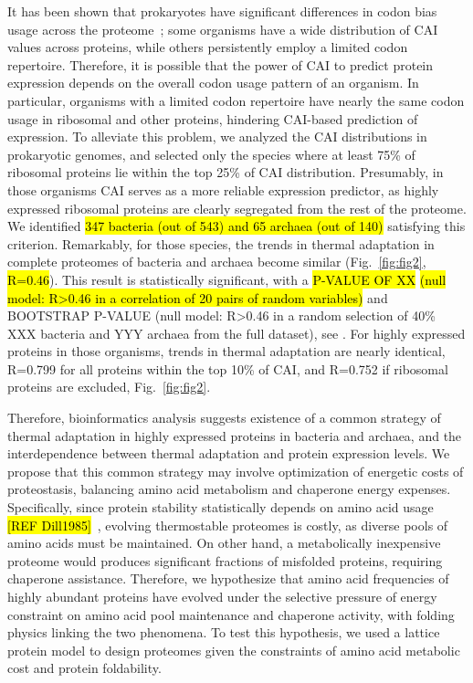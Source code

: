 \documentclass[10pt,letterpaper]{article}
\begin{document}
It has been shown that prokaryotes have significant differences in codon bias usage across the proteome~\cite{Botzman2011Variation}; some organisms have a wide distribution of CAI values across proteins, while others persistently employ a limited codon repertoire. Therefore, it is possible that the  power of CAI to predict protein expression depends on the overall codon usage pattern of an organism. In particular, organisms with a limited codon repertoire have nearly the same codon usage in ribosomal and other proteins, hindering CAI-based prediction of expression. To alleviate this problem, we analyzed the CAI distributions in prokaryotic genomes, and selected only the species where at least 75\% of ribosomal proteins lie within the top 25\% of CAI distribution. Presumably, in those organisms CAI serves as a more reliable expression predictor, as highly expressed ribosomal proteins are clearly segregated from the rest of the proteome. We identified \hl{347 bacteria (out of 543) and 65 archaea (out of 140)} satisfying this criterion. Remarkably, for those species, the trends in thermal adaptation in complete proteomes of bacteria and archaea become similar (Fig.~\ref{fig:fig2}, \hl{R=0.46}). This result is statistically significant, with a \hl{P-VALUE OF XX } \hl{(null model: R>0.46 in a correlation of 20 pairs of random variables)} and  BOOTSTRAP P-VALUE (null model: R>0.46 in a random selection of 40\% XXX bacteria and YYY archaea from the full dataset), see .  For highly expressed proteins in those organisms, trends in thermal adaptation are nearly identical, R=0.799 for all proteins within the top 10\% of CAI, and R=0.752 if ribosomal proteins are excluded, Fig.~\ref{fig:fig2}.

Therefore, bioinformatics analysis suggests existence of a common strategy of thermal adaptation in highly expressed proteins in bacteria and archaea, and the interdependence between thermal adaptation and protein expression levels. We propose that this common strategy may involve optimization of energetic costs of proteostasis, balancing amino acid metabolism and chaperone energy expenses. Specifically, since protein stability statistically depends on amino acid usage \hl{[REF Dill1985]}~\cite{Galtier1997Relationships,Zeldovich2007Protein,Venev2015Massively}, evolving thermostable proteomes is costly, as diverse pools of amino acids must be maintained. On other hand, a metabolically inexpensive proteome would produces significant fractions of misfolded proteins, requiring  chaperone assistance. Therefore, we hypothesize that amino acid frequencies of highly abundant proteins have evolved under the selective pressure of energy constraint on amino acid pool maintenance and chaperone activity, with folding physics linking the two phenomena. To test this hypothesis, we used a lattice protein model to design proteomes given the constraints of amino acid metabolic cost and protein foldability.
\end{document}
